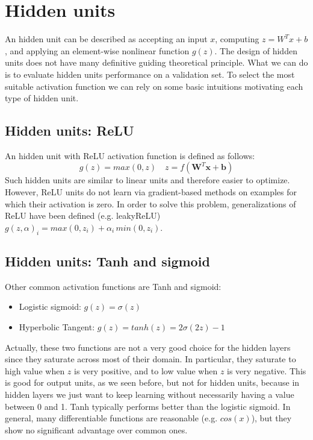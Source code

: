\section{Hidden units}
An hidden unit can be described as accepting an input $x$, computing $z = W^{T}x + b$, and applying an element-wise nonlinear function $g(z)$. The design of hidden units does not have many definitive guiding theoretical principle. What we can do is to evaluate hidden units performance on a validation set. To select the most suitable activation function we can rely on some basic intuitions motivating each type of hidden unit.

\subsection{Hidden units: ReLU}
An hidden unit with ReLU activation function is defined as follows:
\[g(z) = max(0, z) \quad z = f(\textbf{W}^{T}\textbf{x} + \textbf{b})\]
Such hidden units are similar to linear units and therefore easier to optimize. However, ReLU units do not learn via gradient-based methods on examples for which their activation is zero. In order to solve this problem, generalizations of ReLU have been defined (e.g. leakyReLU) $g(z, \alpha)_i = max(0, z_i) + \alpha_i \, min(0, z_i)$.

\subsection{Hidden units: Tanh and sigmoid}
Other common activation functions are Tanh and sigmoid:
\begin{itemize}
    \item Logistic sigmoid: $g(z) = \sigma(z)$
    \item Hyperbolic Tangent: $g(z) = tanh(z) = 2\sigma(2z) - 1$
\end{itemize}
Actually, these two functions are not a very good choice for the hidden layers since they saturate across most of their domain. In particular, they saturate to high value when $z$ is very positive, and to low value when $z$ is very negative. This is good for output units, as we seen before, but not for hidden units, because in hidden layers we just want to keep learning without necessarily having a value between 0 and 1. Tanh typically performs better than the logistic sigmoid.\newline\newline
In general, many differentiable functions are reasonable (e.g. $cos(x)$), but they show no significant advantage over common ones.

